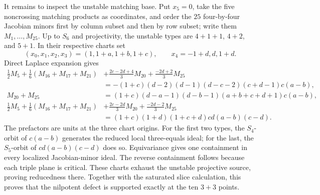 \documentclass[11pt]{article}
\theoremstyle{definition}
\theoremstyle{remark}
\begin{document}
It remains to inspect the unstable matching base.  Put \(x_5=0\), take the
five noncrossing matching products as coordinates, and order the \(25\)
four-by-four Jacobian minors first by column subset and then by row subset;
write them \(M_1,\ldots,M_{25}\).  Up to \(S_6\) and projectivity, the
unstable types are \(4+1+1\), \(4+2\), and \(5+1\).  In their respective
charts set
\[
 (x_0,x_1,x_2,x_3)=(1,1+a,1+b,1+c),\qquad
 x_4=-1+d, d, 1+d.
\]
Direct Laplace expansion gives
\[
\begin{aligned}
 \tfrac12M_5+\tfrac16(M_{16}+M_{17}+M_{21})
 &+\tfrac{2c-2d+4}{3}M_{20}+\tfrac{-2d+2}{3}M_{25}\\
 & =-(1+c)(d-2)(d-1)(d-c-2)(c+d-1)c(a-b),\\
 M_{20}+M_{25}
 &=(1+c)(d-a-1)(d-b-1)(a+b+c+d+1)c(a-b),\\
 \tfrac12M_5+\tfrac16(M_{16}+M_{17}+M_{21})
 &+\tfrac{2c-2d}{3}M_{20}+\tfrac{-2d-2}{3}M_{25}\\
 &=(1+c)(1+d)(1+c+d)cd(a-b)(c-d).
\end{aligned}
\]
The prefactors are units at the three chart origins.  For the first two
types, the \(S_4\)-orbit of \(c(a-b)\) generates the reduced local
three-equals ideal; for the last, the \(S_5\)-orbit of
\(cd(a-b)(c-d)\) does so.  Equivariance gives one containment in every
localized Jacobian-minor ideal.  The reverse containment follows because
each triple plane is critical.  These charts exhaust the unstable
projective source, proving reducedness there.  Together with the saturated
slice calculation, this proves that the nilpotent defect is supported
exactly at the ten \(3+3\) points.
\end{document}
